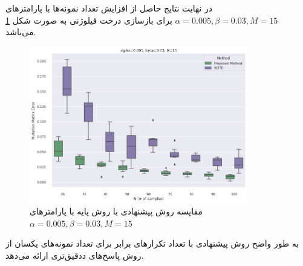 در نهایت نتایج حاصل از افزایش تعداد نمونه‌ها با پارامترهای
 $\alpha=0.005, \beta=0.03, M=15$
 برای بازسازی درخت فیلوژنی به صورت شکل \ref{fig:sy_n_err_mean} می‌باشد.
\begin{figure}[!ht]
	\centering
	\includegraphics[width=0.85\textwidth]{img/chaps/er/comp_pm_scite}
	\caption{‌مقایسه روش پیشنهادی با روش پایه  با پارامترهای $\alpha=0.005, \beta=0.03, M=15$}
	\label{fig:sy_n_err_mean}
\end{figure}
به طور واضح روش پیشنهادی با تعداد تکرارهای برابر برای تعداد نمونه‌های یکسان از روش  پاسخ‌های ددقیق‌تری ارائه می‌دهد.




